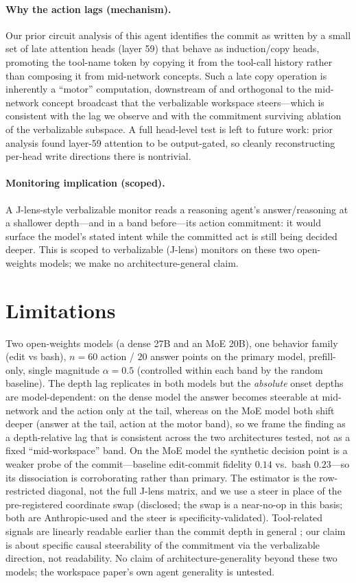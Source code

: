 \documentclass[11pt]{article}
\begin{document}
\paragraph{Why the action lags (mechanism).} Our prior circuit analysis of this agent
\citep{vicentino2026brake} identifies the commit as written by a small set of late attention heads
(layer 59) that behave as induction/copy heads, promoting the tool-name token by copying it from the
tool-call history rather than composing it from mid-network concepts. Such a late copy operation is
inherently a ``motor'' computation, downstream of and orthogonal to the mid-network concept broadcast
that the verbalizable workspace steers---which is consistent with the lag we observe and with the
commitment surviving ablation of the verbalizable subspace. A full head-level test is left to future
work: prior analysis found layer-59 attention to be output-gated, so cleanly reconstructing per-head
write directions there is nontrivial.

\paragraph{Monitoring implication (scoped).} A J-lens-style verbalizable monitor reads a reasoning
agent's answer/reasoning at a shallower depth---and in a band before---its action commitment: it
would surface the model's stated intent while the committed act is still being decided deeper. This
is scoped to verbalizable (J-lens) monitors on these two open-weights models; we make no
architecture-general claim.

\section{Limitations}
Two open-weights models (a dense 27B and an MoE 20B), one behavior family (edit vs bash), $n{=}60$
action / $20$ answer points on the primary model, prefill-only, single magnitude $\alpha{=}0.5$
(controlled within each band by the random baseline). The depth lag replicates in both models but the
\emph{absolute} onset depths are model-dependent: on the dense model the answer becomes steerable at
mid-network and the action only at the tail, whereas on the MoE model both shift deeper (answer at the
tail, action at the motor band), so we frame the finding as a depth-relative lag that is consistent
across the two architectures tested, not as a fixed ``mid-workspace'' band. On the MoE model the synthetic decision point is a weaker probe of the
commit---baseline edit-commit fidelity $0.14$ vs.\ bash $0.23$---so its dissociation is corroborating
rather than primary. The estimator is the row-restricted diagonal, not the full J-lens matrix, and we
use a steer in place of the pre-registered coordinate swap (disclosed; the swap is a near-no-op in
this basis; both are Anthropic-used and the steer is specificity-validated). Tool-related signals are
linearly readable earlier than the commit depth in general
\citep{tooldep2026,when2tool2026}; our claim is about specific causal steerability of the commitment
via the verbalizable direction, not readability. No claim of architecture-generality beyond these two
models; the workspace paper's own agent generality is untested.
\end{document}
